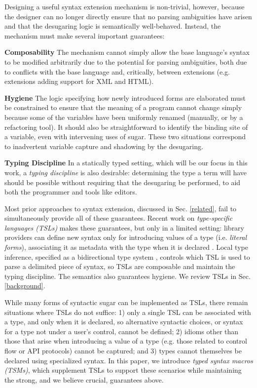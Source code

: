 \documentclass{sig-alternate}
\begin{document}
Designing a useful syntax extension mechanism is non-trivial, however, because the designer can no longer  directly ensure that no parsing ambiguities have arisen and that the desugaring logic is semantically well-behaved. Instead, the mechanism must make several important guarantees:


\textbf{Composability} The mechanism cannot simply allow the base language's syntax to  be modified arbitrarily due to the potential for parsing ambiguities, both due to conflicts with the base language and, critically, between extensions (e.g. extensions adding support for XML and HTML).%


\textbf{Hygiene} The logic specifying how newly introduced forms are elaborated must be constrained to ensure that the meaning of a program cannot change simply because some of the variables have been uniformly renamed (manually, or by a refactoring tool). It should also be straightforward to identify the binding site of a variable, even with intervening uses of sugar. These two situations correspond to inadvertent variable capture and shadowing by the desugaring. 


\textbf{Typing Discipline} In a statically typed setting, which will be our focus in this work, a \emph{typing discipline} is also desirable: determining the type a term will have should be possible without requiring that the desugaring be performed, to aid both the programmer and tools like editors. 

Most prior approaches to syntax extension, discussed in Sec. \ref{related}, fail to simultaneously provide all of these guarantees. Recent work on \emph{type-specific languages  (TSLs)} makes these guarantees, but only in a limited setting: library providers can define new syntax only for introducing values of a type (i.e. \emph{literal forms}), associating it as metadata with the type when it is declared \cite{TSLs}. Local type inference, specified as a bidirectional type system \cite{Pierce:2000:LTI:345099.345100}, controls which TSL is used to parse a delimited piece of syntax, so TSLs are composable and maintain the typing discipline. The semantics also guarantees hygiene. We review TSLs in Sec. \ref{background}. 

While many forms of syntactic sugar can be implemented as TSLs, there remain situations where TSLs do not suffice: 1) only a single TSL can be associated with a type, and only when it is declared, so alternative syntactic choices, or syntax for a type not under a user's control, cannot be defined; 2) idioms other than those that arise when introducing a value of a type (e.g. those related to control flow or API protocols) cannot be captured; and 3) types cannot themselves be declared using specialized syntax. In this paper, we introduce \emph{typed syntax macros (TSMs)}, which supplement TSLs to support these scenarios while maintaining the strong, and we believe crucial, guarantees above.%
\end{document}
